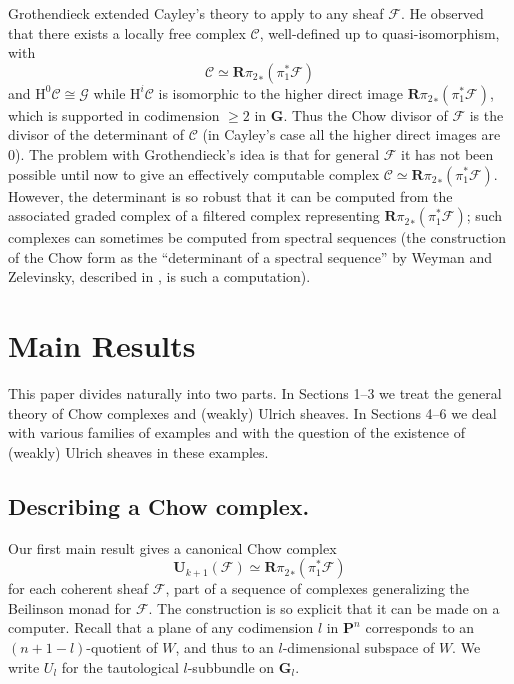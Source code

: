 \documentclass{jams-l}
\theoremstyle{definition}
\theoremstyle{remark}
\newcommand{\C}{{\mathcal C}}
\newcommand{\F}{{\mathcal F}}
\newcommand{\G}{{\mathcal G}}
\newcommand{\GG}{{\mathbf G}}
\newcommand{\Hrm}{{\mathrm H}}
\newcommand{\PP}{{\mathbf P}}
\newcommand{\UU}{{\mathbf U}}
\newcommand{\iso}{\cong}
\begin{document}
Grothendieck extended Cayley's theory to apply to any sheaf
$\F$. He observed that  there exists a locally free
complex $\C$, well-defined up to quasi-isomorphism, with 
\[
\C \simeq {{\mathbf R}\pi_2}_*(\pi_1^*\F)
\]  
and $\Hrm^0\C\iso \G$ while
$\Hrm^i\C$ is isomorphic to the higher
direct image ${{\mathbf R}\pi_2}_*(\pi_1^*\F)$, which is supported
in codimension $\geq 2$ in $\GG$.
Thus the Chow divisor of $\F$ is the divisor of the determinant
of $\C$ (in Cayley's case all the higher
direct images are 0).
The problem with Grothendieck's idea 
is that for general $\F$
it has not been possible until now to give
an effectively computable 
complex $\C \simeq {{\mathbf R}\pi_2}_*(\pi_1^*\F)$.
However, the determinant is so robust that
it can be computed from the associated graded complex
of a filtered complex representing
${{\mathbf R}\pi_2}_*(\pi_1^*\F)$; such complexes can
sometimes be
computed from spectral sequences (the construction
of the Chow form as the ``determinant of a spectral sequence''
by Weyman and Zelevinsky, described in
\cite[Section 3.4.C]{Gelfandetal.1994}, is such
a computation).

\section*{Main Results}

This paper divides naturally into two parts. In Sections 1--3
we treat the general theory of Chow complexes and (weakly) Ulrich
sheaves. In Sections 4--6 we deal with various families of
examples and with the question of the existence of (weakly)
Ulrich sheaves in these examples.

\subsection*{Describing a Chow complex.}
Our first main result gives a canonical 
Chow complex 
\[
\UU_{k+1}(\F) \simeq {{\mathbf R}\pi_2}_*(\pi_1^*\F)
\]  
for each coherent sheaf $\F$, part of a 
sequence of complexes generalizing the Beilinson monad for $\F$.
The construction is so explicit that it can be made on a computer.
Recall that a plane of any
codimension $l$ in $\PP^n$ corresponds to
an $(n+1-l)$-quotient of $W$, 
and thus to an $l$-dimensional subspace of
$W$. We write $U_l$ for 
the tautological $l$-subbundle on $\GG_l$.
\end{document}

